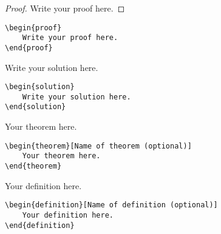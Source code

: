 \documentclass[xelatex,ja=standard,b5j,8pt,magstyle=nomag*,japaram={units}]{bxjsarticle}
\begin{document}
\begin{multicols}{2}
\begin{proof}
    Write your proof here. 
\end{proof}

\columnbreak

\begin{lstlisting}
\begin{proof}
    Write your proof here. 
\end{proof}
\end{lstlisting}
\end{multicols}

\begin{multicols}{2}
\begin{solution}
    Write your solution here. 
\end{solution}

\columnbreak

\begin{lstlisting}
\begin{solution}
    Write your solution here. 
\end{solution}
\end{lstlisting}
\end{multicols}

\begin{multicols}{2}
\begin{theorem}
    Your theorem here.
\end{theorem}

\columnbreak

\begin{lstlisting}
\begin{theorem}[Name of theorem (optional)]
    Your theorem here.
\end{theorem}
\end{lstlisting}
    
\end{multicols}


\begin{multicols}{2}
\begin{definition}
    Your definition here.
\end{definition}

\columnbreak

\begin{lstlisting}
\begin{definition}[Name of definition (optional)]
    Your definition here.
\end{definition}
\end{lstlisting}

\end{multicols}
\end{document}

